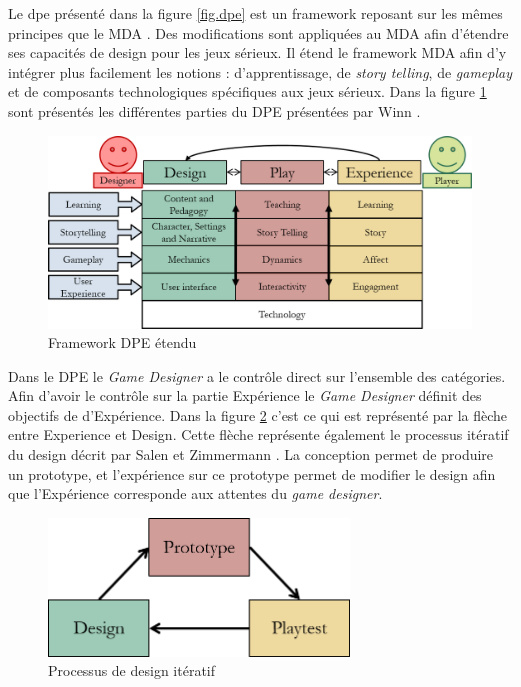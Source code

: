 Le \gls{dpe} présenté dans la figure \ref{fig.dpe} est un framework reposant sur les mêmes principes que le MDA . Des modifications sont appliquées au MDA afin d'étendre ses capacités de design pour les jeux sérieux. Il étend le framework MDA afin d'y intégrer plus facilement les notions : d'apprentissage, de  \emph{story telling}, de  \emph{gameplay} et de composants technologiques spécifiques aux jeux sérieux. Dans la figure \ref{fig.dpe_extended} sont présentés les différentes parties du DPE présentées par Winn \cite{Winn2011}.


\begin{figure}[H]
    \centering
    \includegraphics[width=14cm]{10_img/chap3/dpe_extended.png} 
    \caption{Framework DPE étendu \cite{Winn2011}}
    \label{fig.dpe_extended}
\end{figure}


Dans le DPE le \emph{Game Designer} a le contrôle direct sur l'ensemble des catégories. Afin d'avoir le contrôle sur la partie Expérience le \emph{Game Designer} définit des objectifs de d'Expérience. Dans la figure \ref{fig.dpe_iteratif} c'est ce qui est représenté par la flèche entre Experience et Design. Cette flèche représente également le processus itératif du design décrit par Salen et Zimmermann \cite{Salen2013}. La conception permet de produire un prototype, et l'expérience sur ce prototype permet de modifier le design afin que l'Expérience corresponde aux attentes du \emph{game designer}.

\begin{figure}[H]
    \centering
    \includegraphics[width=8cm]{10_img/chap3/iteration_prototype.png} 
    \caption{Processus de design itératif \cite{Winn2011}}
    \label{fig.dpe_iteratif}
\end{figure}





